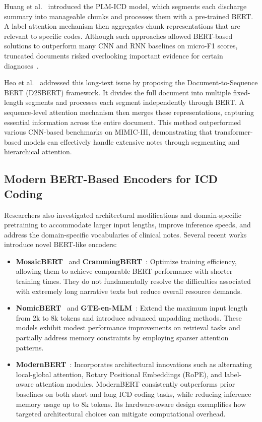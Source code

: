Huang et al.~\citep{huang2022plm} introduced the PLM-ICD model, which segments each discharge summary into manageable chunks and processes them with a pre-trained BERT. A label attention mechanism then aggregates chunk representations that are relevant to specific codes. Although such approaches allowed BERT-based solutions to outperform many CNN and RNN baselines on micro-F1 scores, truncated documents risked overlooking important evidence for certain diagnoses~\citep{dong2022automated}.

Heo et al.~\citep{heo2022medical} addressed this long-text issue by proposing the Document-to-Sequence BERT (D2SBERT) framework. It divides the full document into multiple fixed-length segments and processes each segment independently through BERT. A sequence-level attention mechanism then merges these representations, capturing essential information across the entire document. This method outperformed various CNN-based benchmarks on MIMIC-III, demonstrating that transformer-based models can effectively handle extensive notes through segmenting and hierarchical attention.

\subsection{Modern BERT-Based Encoders for ICD Coding}

Researchers also investigated architectural modifications and domain-specific pretraining to accommodate larger input lengths, improve inference speeds, and address the domain-specific vocabularies of clinical notes. Several recent works introduce novel BERT-like encoders:

\begin{itemize}
    \item \textbf{MosaicBERT}~\citep{portes2023mosaicbert} and \textbf{CrammingBERT}~\citep{geiping2023cramming}: Optimize training efficiency, allowing them to achieve comparable BERT performance with shorter training times. They do not fundamentally resolve the difficulties associated with extremely long narrative texts but reduce overall resource demands.
    \item \textbf{NomicBERT}~\citep{nussbaum2024nomicbert} and \textbf{GTE-en-MLM}~\citep{zhang2024gte}: Extend the maximum input length from 2k to 8k tokens and introduce advanced unpadding methods. These models exhibit modest performance improvements on retrieval tasks and partially address memory constraints by employing sparser attention patterns.
    \item \textbf{ModernBERT}~\citep{warner2024modernbert}: Incorporates architectural innovations such as alternating local-global attention, Rotary Positional Embeddings (RoPE), and label-aware attention modules. ModernBERT consistently outperforms prior baselines on both short and long ICD coding tasks, while reducing inference memory usage up to 8k tokens. Its hardware-aware design exemplifies how targeted architectural choices can mitigate computational overhead.
\end{itemize}

